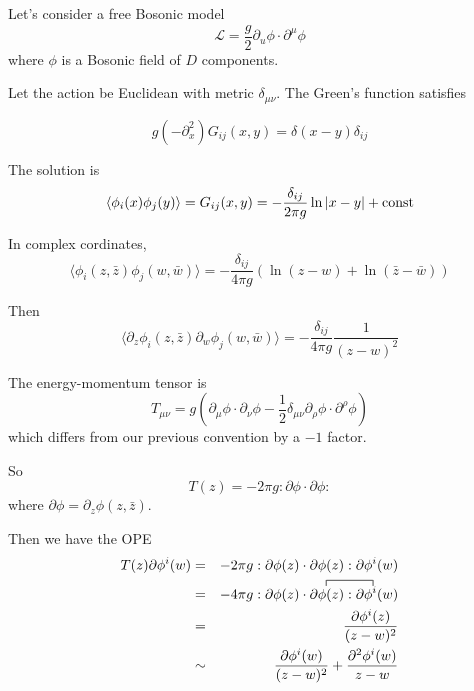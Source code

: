\documentclass[12pt]{book}
\begin{document}
	Let's consider a free Bosonic model
	\begin{equation}
		\mathcal L=\frac g2\partial_u\phi\cdot\partial^\mu\phi
	\end{equation}
	where $\phi$ is a Bosonic field of $D$ components. 
	
	Let the action be Euclidean with metric $\delta_{\mu\nu}$. The Green's function satisfies
	
	\begin{equation}
		g(-\partial^2_x)G_{ij}(x,y)=\delta(x-y)\delta_{ij}
	\end{equation}
	
	The solution is
	\begin{equation}
		\langle\phi_i(x)\phi_j(y)\rangle=G_{ij}(x,y)=-\frac {\delta_{ij}}{2\pi g}\ln|x-y|+{\rm const}
	\end{equation}
	
	In complex cordinates,
	\begin{equation}
		\langle\phi_i(z,\bar z)\phi_j(w,\bar w)\rangle=-\frac {\delta_{ij}}{4\pi g}(\ln(z-w)+\ln(\bar z-\bar w))
	\end{equation}
	
	Then
	\begin{equation}
		\langle\partial_z\phi_i(z,\bar z)\partial_w\phi_j(w,\bar w)\rangle=-\frac {\delta_{ij}}{4\pi g}\frac 1{(z-w)^2}
	\end{equation}
	
	The energy-momentum tensor is
	\begin{equation}
		T_{\mu\nu}=g(\partial_\mu\phi\cdot\partial_\nu\phi-\frac 12\delta_{\mu\nu}\partial_\rho\phi\cdot\partial^\rho\phi)
	\end{equation}
	which differs from our previous convention by a $-1$ factor.
	
	So
	\begin{equation}
		T(z)=-2\pi g:\partial\phi\cdot\partial\phi:
	\end{equation}
	where $\partial\phi=\partial_z\phi(z,\bar z)$.
	
	Then we have the OPE
	\begin{eqnarray}
		T(z)\partial\phi^i(w)&=&-2\pi g:\partial\phi(z)\cdot\partial\phi(z):\partial\phi^i(w)\\
		\contraction{\quad=-4\pi g:\partial\phi(z)\cdot\partial}{\phi}{(z):\partial}{\phi}
		&=&-4\pi g:\partial\phi(z)\cdot\partial\phi(z):\partial\phi^i(w)\\
		&=&\frac{\partial\phi^i(z)}{(z-w)^2}\\
		&\sim&\frac{\partial\phi^i(w)}{(z-w)^2}+\frac{\partial^2\phi^i(w)}{z-w}
	\end{eqnarray}
	
\end{document}
